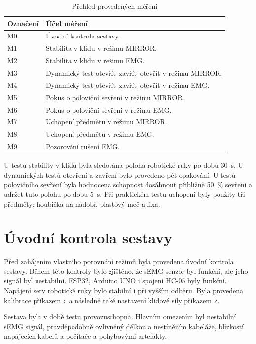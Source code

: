 \begin{table}[H]
\centering
\caption{Přehled provedených měření}
\label{tab:prehled-mereni}
\begin{tabular}{|p{}|p{}|}
\hline
\textbf{Označení} & \textbf{Účel měření} \\
\hline
M0 & Úvodní kontrola sestavy. \\
\hline
M1 & Stabilita v klidu v režimu MIRROR\@. \\
\hline
M2 & Stabilita v klidu v režimu EMG\@. \\
\hline
M3 & Dynamický test otevřít--zavřít--otevřít v režimu MIRROR\@. \\
\hline
M4 & Dynamický test otevřít--zavřít--otevřít v režimu EMG\@. \\
\hline
M5 & Pokus o poloviční sevření v režimu MIRROR\@. \\
\hline
M6 & Pokus o poloviční sevření v režimu EMG\@. \\
\hline
M7 & Uchopení předmětu v režimu MIRROR\@. \\
\hline
M8 & Uchopení předmětu v režimu EMG\@. \\
\hline
M9 & Pozorování rušení EMG\@. \\
\hline
\end{tabular}
\end{table}

U testů stability v klidu byla sledována poloha robotické ruky po dobu 30~s. U dynamických testů otevření a zavření bylo provedeno pět opakování. U testů polovičního sevření byla hodnocena schopnost dosáhnout přibližně 50~\% sevření a udržet tuto polohu po dobu 5~s. Při praktickém testu uchopení byly použity tři předměty: houbička na nádobí, plastový meč a fixa.

\section{Úvodní kontrola sestavy}
\label{sec:uvodni-kontrola}

Před zahájením vlastního porovnání režimů byla provedena úvodní kontrola sestavy. Během této kontroly bylo zjištěno, že sEMG senzor byl funkční, ale jeho signál byl nestabilní. ESP32, Arduino UNO i spojení HC-05 byly funkční. Napájení serv robotické ruky bylo stabilní i při vyšším odběru. Byla provedena kalibrace příkazem \texttt{c} a následně také nastavení klidové síly příkazem \texttt{z}.

Sestava byla v době testu provozuschopná. Hlavním omezením byl nestabilní sEMG signál, pravděpodobně ovlivněný délkou a nestíněním kabeláže, blízkostí napájecích kabelů a počítače a pohybovými artefakty.

